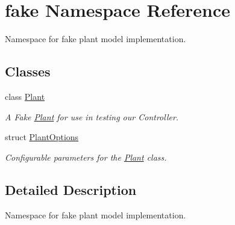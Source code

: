 \hypertarget{namespacefake}{}\section{fake Namespace Reference}
\label{namespacefake}


Namespace for fake plant model implementation.  


\subsection*{Classes}
\begin{DoxyCompactItemize}
\item 
class \hyperlink{classfake_1_1_plant}{Plant}
\begin{DoxyCompactList}\small\item\em A Fake \hyperlink{classfake_1_1_plant}{Plant} for use in testing our Controller. \end{DoxyCompactList}\item 
struct \hyperlink{structfake_1_1_plant_options}{Plant\+Options}
\begin{DoxyCompactList}\small\item\em Configurable parameters for the \hyperlink{classfake_1_1_plant}{Plant} class. \end{DoxyCompactList}\end{DoxyCompactItemize}


\subsection{Detailed Description}
Namespace for fake plant model implementation. 